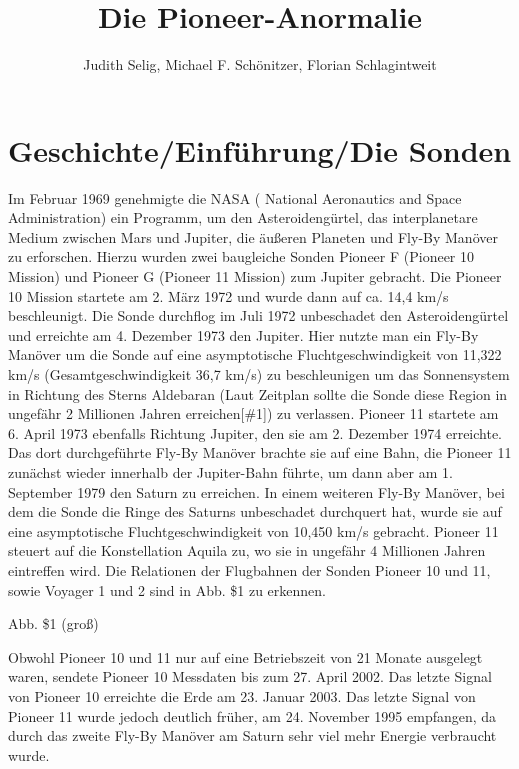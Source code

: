 \documentclass[a4paper,10pt]{article}
\title{Die Pioneer-Anormalie}
\author{Judith Selig, Michael F. Schönitzer, Florian Schlagintweit}
\begin{document}
\maketitle

% 

\section{Geschichte/Einführung/Die Sonden}
Im Februar 1969 genehmigte die NASA ( National Aeronautics and Space Administration) ein Programm,
um den Asteroidengürtel, das interplanetare Medium zwischen Mars und Jupiter,
die äußeren Planeten und Fly-By Manöver zu erforschen. Hierzu wurden zwei baugleiche Sonden Pioneer F (Pioneer 10 Mission)
und Pioneer G (Pioneer 11 Mission) zum Jupiter gebracht.
Die Pioneer 10 Mission startete am 2. März 1972 und wurde dann auf ca. 14,4 km/s beschleunigt.
Die Sonde durchflog im Juli 1972 unbeschadet den Asteroidengürtel und erreichte am 4. Dezember 1973 den Jupiter.
Hier nutzte man ein Fly-By Manöver um die Sonde auf eine asymptotische Fluchtgeschwindigkeit von 11,322 km/s
(Gesamtgeschwindigkeit 36,7 km/s) zu beschleunigen um das Sonnensystem in Richtung des Sterns Aldebaran
(Laut Zeitplan sollte die Sonde diese Region in ungefähr 2 Millionen Jahren erreichen[\#1]) zu verlassen.
Pioneer 11 startete am 6. April 1973 ebenfalls Richtung Jupiter, den sie am 2. Dezember 1974 erreichte.
Das dort durchgeführte Fly-By Manöver brachte sie auf eine Bahn, die Pioneer 11 zunächst wieder innerhalb der Jupiter-Bahn führte,
um dann aber am 1. September 1979 den Saturn zu erreichen. In einem weiteren Fly-By Manöver,
bei dem die Sonde die Ringe des Saturns unbeschadet durchquert hat, wurde sie auf eine asymptotische Fluchtgeschwindigkeit
von 10,450 km/s gebracht. Pioneer 11 steuert auf die Konstellation Aquila zu,
wo sie in ungefähr 4 Millionen Jahren eintreffen wird.
Die Relationen der Flugbahnen der Sonden Pioneer 10 und 11, sowie Voyager 1 und 2 sind in Abb. \$1 zu erkennen.

Abb. \$1 (groß)

Obwohl Pioneer 10 und 11 nur auf eine Betriebszeit von 21 Monate ausgelegt waren,
sendete Pioneer 10 Messdaten bis zum 27. April 2002. Das letzte Signal von Pioneer 10 erreichte die Erde am 23. Januar 2003.
Das letzte Signal von Pioneer 11 wurde jedoch deutlich früher, am 24. November 1995 empfangen,
da durch das zweite Fly-By Manöver am Saturn sehr viel mehr Energie verbraucht wurde.
\end{document}
